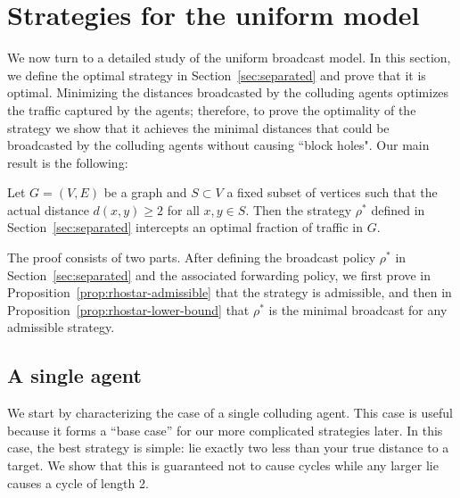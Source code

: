\documentclass{comnet}
\begin{document}
\section{Strategies for the uniform model} \label{sec:strategies}

We now turn to a detailed study of the uniform broadcast model. In this section,
we define the optimal strategy in Section~\ref{sec:separated} and prove that it is optimal. Minimizing the distances broadcasted by the colluding agents optimizes the traffic captured by the agents; therefore, to prove the optimality of the strategy we show that it achieves the minimal distances that could be broadcasted by the colluding agents without causing ``block holes". Our main result is the following:

\begin{theorem} \label{thm:optimal-separated}

Let $G = (V,E)$ be a graph and $S \subset V$ a fixed subset of vertices such
that the actual distance $d(x, y) \geq 2$ for all $x,y \in S$. Then the strategy $\rho^*$ defined
in Section~\ref{sec:separated} intercepts an optimal fraction of traffic in
$G$.

\end{theorem}

The proof consists of two parts. After defining the broadcast policy
$\rho^*$ in Section~\ref{sec:separated} and the associated forwarding
policy, we first prove in Proposition~\ref{prop:rhostar-admissible} that the
strategy is admissible, and then in Proposition~\ref{prop:rhostar-lower-bound}
that $\rho^*$ is the minimal broadcast for any admissible strategy.

\subsection{A single agent} \label{sec:single-agent}

We start by characterizing the case of a single colluding agent. This case is
useful because it forms a ``base case'' for our more complicated
strategies later. In this case, the best strategy is simple: lie exactly two less than
your true distance to a target. We show that this is guaranteed not to cause cycles while any larger lie causes a cycle of length 2. 
\end{document}
